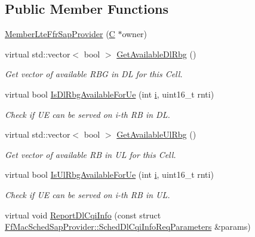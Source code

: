 \subsection*{Public Member Functions}
\begin{DoxyCompactItemize}
\item 
\hyperlink{classns3_1_1MemberLteFfrSapProvider_a45c3dd6a2178f085f34a6b7387afc034}{Member\+Lte\+Ffr\+Sap\+Provider} (\hyperlink{loss__COST231__small__cities__urban_8m_aaa53ca0b650dfd85c4f59fa156f7a2cc}{C} $\ast$owner)
\item 
virtual std\+::vector$<$ bool $>$ \hyperlink{classns3_1_1MemberLteFfrSapProvider_a514f0f3befde68fa0a3d2e293b807a45}{Get\+Available\+Dl\+Rbg} ()
\begin{DoxyCompactList}\small\item\em Get vector of available R\+BG in DL for this Cell. \end{DoxyCompactList}\item 
virtual bool \hyperlink{classns3_1_1MemberLteFfrSapProvider_a43a22b25734d3aeab48fe14abfb13110}{Is\+Dl\+Rbg\+Available\+For\+Ue} (int \hyperlink{lte__uplink__power__control_8m_a6f6ccfcf58b31cb6412107d9d5281426}{i}, uint16\+\_\+t rnti)
\begin{DoxyCompactList}\small\item\em Check if UE can be served on i-\/th RB in DL. \end{DoxyCompactList}\item 
virtual std\+::vector$<$ bool $>$ \hyperlink{classns3_1_1MemberLteFfrSapProvider_ab9d562305cf6957700e84d5e3fe49bf0}{Get\+Available\+Ul\+Rbg} ()
\begin{DoxyCompactList}\small\item\em Get vector of available RB in UL for this Cell. \end{DoxyCompactList}\item 
virtual bool \hyperlink{classns3_1_1MemberLteFfrSapProvider_a0299fff0a982cff092e2ed269540c7a8}{Is\+Ul\+Rbg\+Available\+For\+Ue} (int \hyperlink{lte__uplink__power__control_8m_a6f6ccfcf58b31cb6412107d9d5281426}{i}, uint16\+\_\+t rnti)
\begin{DoxyCompactList}\small\item\em Check if UE can be served on i-\/th RB in UL. \end{DoxyCompactList}\item 
virtual void \hyperlink{classns3_1_1MemberLteFfrSapProvider_ad9606a31a78f7385ae5f3fe828fee18b}{Report\+Dl\+Cqi\+Info} (const struct \hyperlink{structns3_1_1FfMacSchedSapProvider_1_1SchedDlCqiInfoReqParameters}{Ff\+Mac\+Sched\+Sap\+Provider\+::\+Sched\+Dl\+Cqi\+Info\+Req\+Parameters} \&params)

\end{DoxyCompactItemize}
